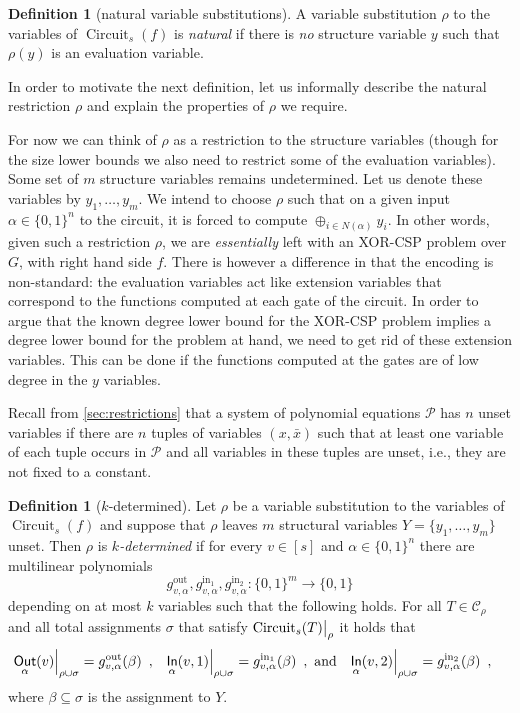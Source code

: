 \documentclass[10pt,a4paper]{article}
\theoremstyle{plain}
\theoremstyle{remark}
\theoremstyle{definition}
\newtheorem{definition}[theorem]{Definition}
\newcommand{\eqcomma}{\enspace ,}
\newcommand{\set}[1]{\{#1\}}
\newcommand\restrict[2]{{%
  \left.\kern-\nulldelimiterspace %
  #1 %
  \vphantom{\big|} %
  \right|_{#2} %
  }}
\newcommand{\calC}{\mathcal{C}}
\newcommand{\calP}{\mathcal{P}}
\newcommand{\gout}{g^\mathrm{out}}
\newcommand{\ginone}{g^\mathrm{in_1}}
\newcommand{\gintwo}{g^\mathrm{in_2}}
\newcommand{\vars}[1]{\mathsf{#1}}
\DeclareMathOperator{\circuit}{Circuit}
\DeclareMathOperator{\outwire}{\vars{Out}}
\DeclareMathOperator{\inwire}{\vars{In}}
\begin{document}
\begin{definition}[natural variable substitutions]
  A variable substitution $\rho$ to the variables of $\circuit_s(f)$ is
  \emph{natural} if there is \emph{no} structure variable $y$ such
  that $\rho(y)$ is an evaluation variable.
\end{definition}

In order to motivate the next definition, let us informally
describe the natural restriction $\rho$ and explain the properties of
$\rho$ we require.

For now we can think of $\rho$ as a restriction to the structure
variables (though for the size lower bounds we also need to restrict
some of the evaluation variables). Some set of $m$ structure variables remains
undetermined. Let us denote these variables by $y_1, \ldots, y_m$. We
intend to choose $\rho$ such that on a given input
$\alpha \in \set{0,1}^n$ to the circuit, it is forced to compute
$\oplus_{i \in N(\alpha)} y_i$.  In other words, given such a
restriction $\rho$, we are \emph{essentially} left with an XOR-CSP
problem over $G$, with right hand side $f$.  There is however a
difference in that the encoding is non-standard: the evaluation
variables act like extension variables that correspond to the
functions computed at each gate of the circuit. In order to argue that
the known degree lower bound for the XOR-CSP problem implies a degree
lower bound for the problem at hand, we need to get rid of these
extension variables. This can be done if the functions computed at the
gates are of low degree in the $y$ variables.

Recall from \cref{sec:restrictions} that a system of polynomial
equations $\calP$ has $n$ unset variables if there are $n$ tuples of
variables $(x, \bar x)$ such that at least one variable of each tuple
occurs in $\calP$ and all variables in these tuples are unset, i.e.,
they are not fixed to a constant.

\begin{definition}[$k$-determined]
  \label{def:determined}%
  Let $\rho$ be a variable substitution to the variables of
  $\circuit_s(f)$ and suppose that $\rho$ leaves $m$ structural
  variables $Y = \set{y_1, \ldots, y_m}$ unset.  Then $\rho$ is
  \emph{$k$-determined} if for every $v \in [s]$ and
  $\alpha \in \set{0,1}^n$ there are multilinear polynomials
  $$\gout_{v, \alpha}, \ginone_{v, \alpha}, \gintwo_{v, \alpha}:
  \set{0,1}^m \rightarrow \set{0,1}$$ depending on at most $k$
  variables such that the following holds. For all $T \in \calC_\rho$
  and all total assignments $\sigma$ that satisfy
  $\restrict{\circuit_s(T)}{\rho}$ it holds that
  \begin{align}
    \label{eq:k-determined-substitution}
    \restrict{\outwire_\alpha(v)}{\rho \cup \sigma} &=
    \gout_{v, \alpha}(\beta) \eqcomma &
    \restrict{\inwire_\alpha(v, 1)}{\rho \cup \sigma} &= \ginone_{v,
    \alpha}(\beta) \eqcomma \text{~and} &
    \restrict{\inwire_\alpha(v, 2)}{\rho \cup \sigma} &= \gintwo_{v,
    \alpha}(\beta) \eqcomma
  \end{align}
  where $\beta \subseteq \sigma$ is the assignment to $Y$.
\end{definition}
\end{document}
